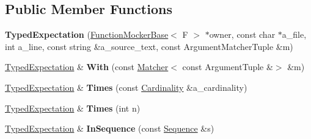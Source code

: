 \subsection*{Public Member Functions}
\begin{DoxyCompactItemize}
\item 
\mbox{\label{classtesting_1_1internal_1_1_typed_expectation_a10bd0a8fa0db37215be42e1c61ccbc28}} 
{\bfseries Typed\+Expectation} (\hyperlink{classtesting_1_1internal_1_1_function_mocker_base}{Function\+Mocker\+Base}$<$ F $>$ $\ast$owner, const char $\ast$a\+\_\+file, int a\+\_\+line, const string \&a\+\_\+source\+\_\+text, const Argument\+Matcher\+Tuple \&m)
\item 
\mbox{\label{classtesting_1_1internal_1_1_typed_expectation_aa69c4f9b1f2cce49609023d7e5f65297}} 
\hyperlink{classtesting_1_1internal_1_1_typed_expectation}{Typed\+Expectation} \& {\bfseries With} (const \hyperlink{classtesting_1_1_matcher}{Matcher}$<$ const Argument\+Tuple \&$>$ \&m)
\item 
\mbox{\label{classtesting_1_1internal_1_1_typed_expectation_a9a4c34ee5c6e6adc880a22f61f33da57}} 
\hyperlink{classtesting_1_1internal_1_1_typed_expectation}{Typed\+Expectation} \& {\bfseries Times} (const \hyperlink{classtesting_1_1_cardinality}{Cardinality} \&a\+\_\+cardinality)
\item 
\mbox{\label{classtesting_1_1internal_1_1_typed_expectation_a92d56ee785d38ec8193aed2a0fcbccf0}} 
\hyperlink{classtesting_1_1internal_1_1_typed_expectation}{Typed\+Expectation} \& {\bfseries Times} (int n)
\item 
\mbox{\label{classtesting_1_1internal_1_1_typed_expectation_ada9e9081a98435991310ac60483d1230}} 
\hyperlink{classtesting_1_1internal_1_1_typed_expectation}{Typed\+Expectation} \& {\bfseries In\+Sequence} (const \hyperlink{classtesting_1_1_sequence}{Sequence} \&s)
\item 
\mbox{\label{classtesting_1_1internal_1_1_typed_expectation_ac0f45c73e3f816796f6c5dea2dc70131}} 

\end{DoxyCompactItemize}
